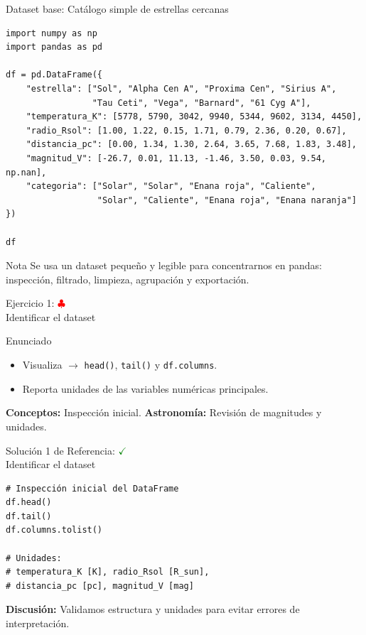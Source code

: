 \documentclass[10pt]{beamer}
\begin{document}
\begin{frame}[fragile]{Dataset base: Catálogo simple de estrellas cercanas}
\begin{verbatim}
import numpy as np
import pandas as pd

df = pd.DataFrame({
    "estrella": ["Sol", "Alpha Cen A", "Proxima Cen", "Sirius A",
                 "Tau Ceti", "Vega", "Barnard", "61 Cyg A"],
    "temperatura_K": [5778, 5790, 3042, 9940, 5344, 9602, 3134, 4450],
    "radio_Rsol": [1.00, 1.22, 0.15, 1.71, 0.79, 2.36, 0.20, 0.67],
    "distancia_pc": [0.00, 1.34, 1.30, 2.64, 3.65, 7.68, 1.83, 3.48],
    "magnitud_V": [-26.7, 0.01, 11.13, -1.46, 3.50, 0.03, 9.54, np.nan],
    "categoria": ["Solar", "Solar", "Enana roja", "Caliente",
                  "Solar", "Caliente", "Enana roja", "Enana naranja"]
})

df
\end{verbatim}

\begin{alertblock}{Nota}
Se usa un dataset pequeño y legible para concentrarnos en pandas: inspección, filtrado, limpieza, agrupación y exportación.
\end{alertblock}
\end{frame}
\begin{frame}{Ejercicio 1: \hfill \textcolor{red}{$\clubsuit$} \\ Identificar el dataset}
\begin{block}{Enunciado}
  \begin{itemize}
    \item Visualiza $\rightarrow$ \texttt{head()}, \texttt{tail()} y \texttt{df.columns}.
    \item Reporta unidades de las variables numéricas principales.
  \end{itemize}
\end{block}
\textbf{Conceptos:} Inspección inicial. \quad
\textbf{Astronomía:} Revisión de magnitudes y unidades.
\end{frame}

\begin{solutionblock}
\begin{frame}[fragile]{Solución 1 de Referencia: \hfill \textcolor{green}{$\checkmark$} \\ Identificar el dataset}
\begin{verbatim}
# Inspección inicial del DataFrame
df.head()
df.tail()
df.columns.tolist()

# Unidades:
# temperatura_K [K], radio_Rsol [R_sun],
# distancia_pc [pc], magnitud_V [mag]
\end{verbatim}
\textbf{Discusión:} Validamos estructura y unidades para evitar errores de interpretación.
\end{frame}
\end{solutionblock}
\end{document}
